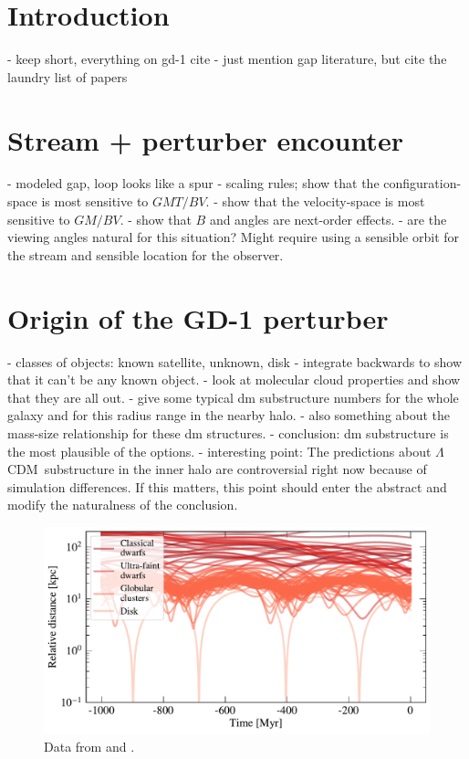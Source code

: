 \documentclass[12pt, modern]{aastex62}
\newcommand{\acronym}[1]{{\small{#1}}}
\newcommand{\lcdm}{\acronym{$\Lambda$CDM}}
\begin{document}

\section{Introduction}
\label{sec:intro}
- keep short, everything on gd-1 cite
- just mention gap literature, but cite the laundry list of papers

\section{Stream + perturber encounter}
\label{sec:model}
- modeled gap, loop looks like a spur
- scaling rules; show that the configuration-space is most sensitive to $GMT/BV$.
- show that the velocity-space is most sensitive to $GM/BV$.
- show that $B$ and angles are next-order effects.
- are the viewing angles natural for this situation? Might require using a sensible
orbit for the stream and sensible location for the observer.

\section{Origin of the GD-1 perturber}
\label{sec:origin}
- classes of objects: known satellite, unknown, disk
- integrate backwards to show that it can't be any known object.
- look at molecular cloud properties and show that they are all out.
- give some typical dm substructure numbers for the whole galaxy and for this radius range in the nearby halo.
- also something about the mass-size relationship for these dm structures.
- conclusion: dm substructure is the most plausible of the options.
- interesting point: The predictions about \lcdm\ substructure in the inner halo are controversial right now because of simulation differences. If this matters, this point should enter the abstract and modify the naturalness of the conclusion.

\begin{figure}
\begin{center}
\includegraphics[width=\textwidth]{satellite_distances.pdf}
\end{center}
\caption{Data from \citet{simon2018} and \citet{gdr2_satellites}.}
\label{fig:known_encounters}
\end{figure}
\end{document}
